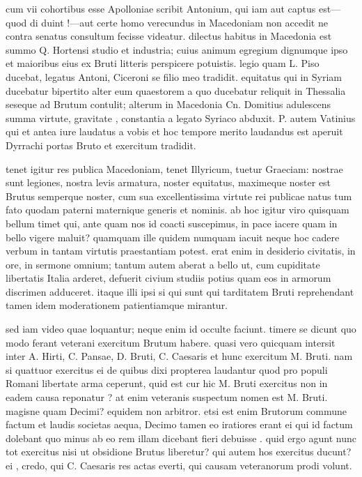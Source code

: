  cum vii cohortibus esse Apolloniae scribit Antonium, qui iam aut captus est—quod di duint !—aut certe homo verecundus in Macedoniam non accedit ne contra senatus consultum fecisse videatur. dilectus habitus in Macedonia est summo Q. Hortensi studio et industria; cuius animum egregium dignumque ipso et maioribus eius ex Bruti litteris perspicere potuistis. legio quam L. Piso ducebat, legatus Antoni, Ciceroni se filio meo tradidit. equitatus qui in Syriam ducebatur bipertito alter eum quaestorem a quo ducebatur reliquit in Thessalia seseque ad Brutum contulit; alterum in Macedonia Cn. Domitius adulescens summa virtute, gravitate , constantia a legato Syriaco abduxit. P. autem Vatinius qui et antea iure laudatus a vobis et hoc tempore merito laudandus est aperuit Dyrrachi portas Bruto et exercitum tradidit.

 tenet igitur res publica Macedoniam, tenet Illyricum, tuetur Graeciam: nostrae sunt legiones, nostra levis armatura, noster equitatus, maximeque noster est Brutus semperque noster, cum sua excellentissima virtute rei publicae natus tum fato quodam paterni maternique generis et nominis. ab hoc igitur viro quisquam bellum timet qui, ante quam nos id coacti suscepimus, in pace iacere quam in bello vigere maluit? quamquam ille quidem numquam iacuit neque hoc cadere verbum in tantam virtutis praestantiam potest. erat enim in desiderio civitatis, in ore, in sermone omnium; tantum autem aberat a bello ut, cum cupiditate libertatis Italia arderet, defuerit civium studiis potius quam eos in armorum discrimen adduceret. itaque illi ipsi si qui sunt qui tarditatem Bruti reprehendant tamen idem moderationem patientiamque mirantur.

 sed iam video quae loquantur; neque enim id occulte faciunt. timere se dicunt quo modo ferant veterani exercitum Brutum habere. quasi vero quicquam intersit inter A. Hirti, C. Pansae, D. Bruti, C. Caesaris et hunc exercitum M. Bruti. nam si quattuor exercitus ei de quibus dixi propterea laudantur quod pro populi Romani libertate arma ceperunt, quid est cur hic M. Bruti exercitus non in eadem causa reponatur ? at enim veteranis suspectum nomen est M. Bruti. magisne quam Decimi? equidem non arbitror. etsi est enim Brutorum commune factum et laudis societas aequa, Decimo tamen eo iratiores erant ei qui id factum dolebant quo minus ab eo rem illam dicebant fieri debuisse . quid ergo agunt nunc tot exercitus nisi ut obsidione Brutus liberetur? qui autem hos exercitus ducunt? ei , credo, qui C. Caesaris res actas everti, qui causam veteranorum prodi volunt.

